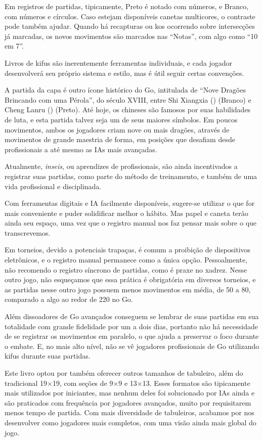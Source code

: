 Em registros de partidas, tipicamente, Preto é notado com números, e Branco, com números e círculos. Caso estejam disponíveis canetas multicores, o contraste pode também ajudar. Quando há recapturas ou kos ocorrendo sobre intersecções já marcadas, os novos movimentos são marcados nas ``Notas'', com algo como ``10 em 7''. 

Livros de kifus são inerentemente ferramentas individuais, e cada jogador desenvolverá seu próprio sistema e estilo, mas é útil seguir certas convenções.

A partida da capa é outro ícone histórico do Go, intitulada de ``Nove Dragões Brincando com uma Pérola'', do século XVIII, entre Shi Xiangxia () (Branco) e Cheng Lanru () (Preto). Até hoje, os chineses são famosos por suas habilidades de luta, e esta partida talvez seja um de seus maiores símbolos. Em poucos movimentos, ambos os jogadores criam nove ou mais dragões, através de movimentos de grande maestria de forma, em posições que desafiam desde profissionais a até mesmo as IAs mais avançadas.

Atualmente, \textit{inseis}, ou aprendizes de profissionais, são ainda incentivados a registrar suas partidas, como parte do método de treinamento, e também de uma vida profissional e disciplinada.

Com ferramentas digitais e IA facilmente disponíveis, sugere-se utilizar o que for mais conveniente e puder solidificar melhor o hábito. Mas papel e caneta terão ainda seu espaço, uma vez que o registro manual nos faz pensar mais sobre o que transcrevemos.

Em torneios, devido a potenciais trapaças, é comum a proibição de dispositivos eletrônicos, e o registro manual permanece como a única opção. Pessoalmente, não recomendo o registro síncrono de partidas, como é praxe no xadrez. Nesse outro jogo, não esqueçamos que essa prática é obrigatória em diversos torneios, e as partidas nesse outro jogo possuem menos movimentos em média, de 50 a 80, comparado a algo ao redor de 220 no Go.

Além dissoadores de Go avançados conseguem se lembrar de suas partidas em sua totalidade com grande fidelidade por um a dois dias, portanto não há necessidade de se registrar os movimentos em paralelo, o que ajuda a preservar o foco durante o embate. E, no mais alto nível, não se vê jogadores profissionais de Go utilizando kifus durante suas partidas.

Este livro optou por também oferecer outros tamanhos de tabuleiro, além do tradicional 19×19, com seções de 9×9 e 13×13. Esses formatos são tipicamente mais utilizados por iniciantes, mas nenhum deles foi solucionado por IAs ainda e são praticados com frequência por jogadores avançados, muito por requisitarem menos tempo de partida. Com mais diversidade de tabuleiros, acabamos por nos desenvolver como jogadores mais completos, com uma visão ainda mais global do jogo.

